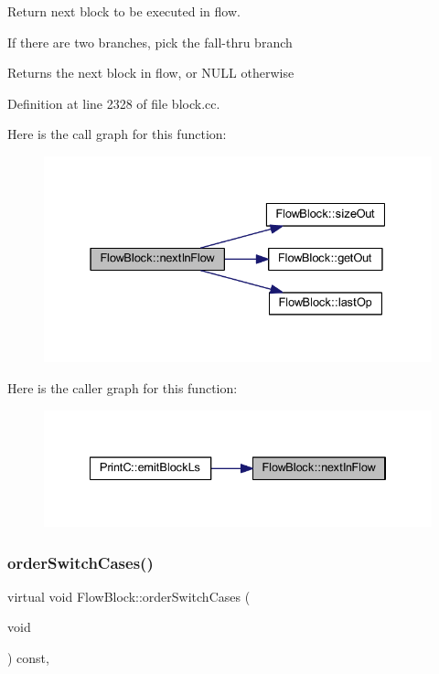 Return next block to be executed in flow. 

If there are two branches, pick the fall-\/thru branch \begin{DoxyReturn}{Returns}
the next block in flow, or N\+U\+LL otherwise 
\end{DoxyReturn}


Definition at line 2328 of file block.\+cc.

Here is the call graph for this function\+:
\nopagebreak
\begin{figure}[H]
\begin{center}
\leavevmode
\includegraphics[width=331pt]{class_flow_block_adb062ea29f2d073206adf61c317e97c7_cgraph}
\end{center}
\end{figure}
Here is the caller graph for this function\+:
\nopagebreak
\begin{figure}[H]
\begin{center}
\leavevmode
\includegraphics[width=334pt]{class_flow_block_adb062ea29f2d073206adf61c317e97c7_icgraph}
\end{center}
\end{figure}
\mbox{\label{class_flow_block_abd18da44c1332bbb2e495fde85863eb5}} 
\subsubsection{\texorpdfstring{orderSwitchCases()}{orderSwitchCases()}}
{\footnotesize\ttfamily virtual void Flow\+Block\+::order\+Switch\+Cases (\begin{DoxyParamCaption}\item[{void}]{ }\end{DoxyParamCaption}) const\hspace{0.3cm}{\ttfamily [inline]}, {\ttfamily [virtual]}}



